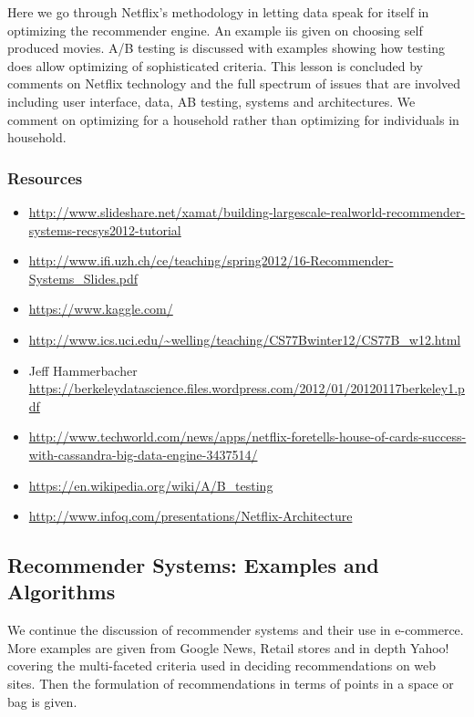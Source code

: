 Here we go through Netflix's methodology in letting data speak for
itself in optimizing the recommender engine. An example iis given on
choosing self produced movies. A/B testing is discussed with examples
showing how testing does allow optimizing of sophisticated criteria.
This lesson is concluded by comments on Netflix technology and the full
spectrum of issues that are involved including user interface, data, AB
testing, systems and architectures. We comment on optimizing for a
household rather than optimizing for individuals in household.


\subsubsection{Resources}\label{resources}

\begin{itemize}

\item
  \url{http://www.slideshare.net/xamat/building-largescale-realworld-recommender-systems-recsys2012-tutorial}
\item
  \url{http://www.ifi.uzh.ch/ce/teaching/spring2012/16-Recommender-Systems_Slides.pdf}
\item
  \url{https://www.kaggle.com/}
\item
  \url{http://www.ics.uci.edu/~welling/teaching/CS77Bwinter12/CS77B_w12.html}
\item
  Jeff Hammerbacher
  \url{https://berkeleydatascience.files.wordpress.com/2012/01/20120117berkeley1.pdf}
\item
  \url{http://www.techworld.com/news/apps/netflix-foretells-house-of-cards-success-with-cassandra-big-data-engine-3437514/}
\item
  \url{https://en.wikipedia.org/wiki/A/B_testing}
\item
  \url{http://www.infoq.com/presentations/Netflix-Architecture}
\end{itemize}

\subsection{Recommender Systems: Examples and
Algorithms}\label{recommender-systems-examples-and-algorithms}

We continue the discussion of recommender systems and their use in
e-commerce. More examples are given from Google News, Retail stores and
in depth Yahoo! covering the multi-faceted criteria used in deciding
recommendations on web sites. Then the formulation of recommendations in
terms of points in a space or bag is given.

